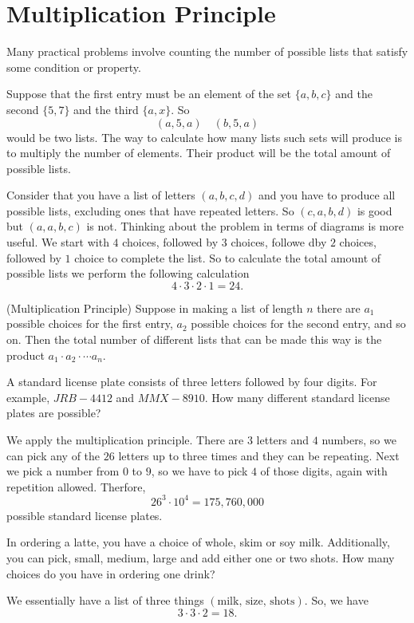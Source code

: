 \section{Multiplication Principle}

Many practical problems involve counting the number of possible lists that satisfy some condition or property. 

Suppose that the first entry must be an element of the set $\{ a,b,c \}$ and the second $\{ 5,7 \}$ and the third $\{ a,x \}$. So 
$$
(a,5,a)\quad (b,5,a)
$$
would be two lists. The way to calculate how many lists such sets will produce is to multiply the number of elements. Their product will be the total amount of possible lists. 

Consider that you have a list of letters $(a,b,c,d)$ and you have to produce all possible lists, excluding ones that have repeated letters. So $(c,a,b,d)$ is good but $(a,a,b,c)$ is not. Thinking about the problem in terms of diagrams is more useful. We start with $4$ choices, followed by $3$ choices, followe dby $2$ choices, followed by $1$ choice to complete the list. So to calculate the total amount of possible lists we perform the following calculation 
$$
4\cdot3\cdot2\cdot1=24.
$$
\begin{fact}
    (Multiplication Principle) Suppose in making a list of length $n$ there are $a_{1}$ possible choices for the first entry, $a_{2}$ possible choices for the second entry, and so on. Then the total number of different lists that can be made this way is the product $a_1\cdot a_2\cdot\cdots a_n $.
\end{fact}
\begin{example}
    A standard license plate consists of three letters followed by four digits. For example, $JRB-4412$ and $MMX-8910$. How many different standard license plates are possible? 
    \begin{solution}
        We apply the multiplication principle. There are $3$ letters and $4$ numbers, so we can pick any of the $26$ letters up to three times and they can be repeating. Next we pick a number from $0$ to $9$, so we have to pick $4$ of those digits, again with repetition allowed. Therfore, 
        $$
        26^{3}\cdot 10^{4}=175,760,000
        $$
        possible standard license plates.
    \end{solution}
\end{example}

\begin{example}
    In ordering a latte, you have a choice of whole, skim or soy milk. Additionally, you can pick, small, medium, large and add either one or two shots. How many choices do you have in ordering one drink?
    \begin{solution}
        We essentially have a list of three things $(\text{milk, size, shots})$. So, we have 
        $$
        3\cdot 3\cdot 2 = 18.
        $$
    \end{solution}
\end{example}


